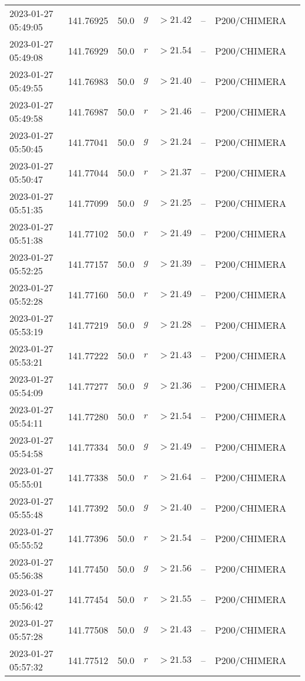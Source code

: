 \documentclass{nature_plusfigure}
\begin{document}
\begin{supplement}
\begin{center}
\begin{longtable}{llllllll}
2023-01-27 05:49:05 & 141.76925 & 50.0 & $g$ & $>21.42$ & -- & P200/CHIMERA &  \\ 
2023-01-27 05:49:08 & 141.76929 & 50.0 & $r$ & $>21.54$ & -- & P200/CHIMERA &  \\ 
2023-01-27 05:49:55 & 141.76983 & 50.0 & $g$ & $>21.40$ & -- & P200/CHIMERA &  \\ 
2023-01-27 05:49:58 & 141.76987 & 50.0 & $r$ & $>21.46$ & -- & P200/CHIMERA &  \\ 
2023-01-27 05:50:45 & 141.77041 & 50.0 & $g$ & $>21.24$ & -- & P200/CHIMERA &  \\ 
2023-01-27 05:50:47 & 141.77044 & 50.0 & $r$ & $>21.37$ & -- & P200/CHIMERA &  \\ 
2023-01-27 05:51:35 & 141.77099 & 50.0 & $g$ & $>21.25$ & -- & P200/CHIMERA &  \\ 
2023-01-27 05:51:38 & 141.77102 & 50.0 & $r$ & $>21.49$ & -- & P200/CHIMERA &  \\ 
2023-01-27 05:52:25 & 141.77157 & 50.0 & $g$ & $>21.39$ & -- & P200/CHIMERA &  \\ 
2023-01-27 05:52:28 & 141.77160 & 50.0 & $r$ & $>21.49$ & -- & P200/CHIMERA &  \\ 
2023-01-27 05:53:19 & 141.77219 & 50.0 & $g$ & $>21.28$ & -- & P200/CHIMERA &  \\ 
2023-01-27 05:53:21 & 141.77222 & 50.0 & $r$ & $>21.43$ & -- & P200/CHIMERA &  \\ 
2023-01-27 05:54:09 & 141.77277 & 50.0 & $g$ & $>21.36$ & -- & P200/CHIMERA &  \\ 
2023-01-27 05:54:11 & 141.77280 & 50.0 & $r$ & $>21.54$ & -- & P200/CHIMERA &  \\ 
2023-01-27 05:54:58 & 141.77334 & 50.0 & $g$ & $>21.49$ & -- & P200/CHIMERA &  \\ 
2023-01-27 05:55:01 & 141.77338 & 50.0 & $r$ & $>21.64$ & -- & P200/CHIMERA &  \\ 
2023-01-27 05:55:48 & 141.77392 & 50.0 & $g$ & $>21.40$ & -- & P200/CHIMERA &  \\ 
2023-01-27 05:55:52 & 141.77396 & 50.0 & $r$ & $>21.54$ & -- & P200/CHIMERA &  \\ 
2023-01-27 05:56:38 & 141.77450 & 50.0 & $g$ & $>21.56$ & -- & P200/CHIMERA &  \\ 
2023-01-27 05:56:42 & 141.77454 & 50.0 & $r$ & $>21.55$ & -- & P200/CHIMERA &  \\ 
2023-01-27 05:57:28 & 141.77508 & 50.0 & $g$ & $>21.43$ & -- & P200/CHIMERA &  \\ 
2023-01-27 05:57:32 & 141.77512 & 50.0 & $r$ & $>21.53$ & -- & P200/CHIMERA &  \\ 

\end{longtable}
\end{center}
\end{supplement}
\end{document}
